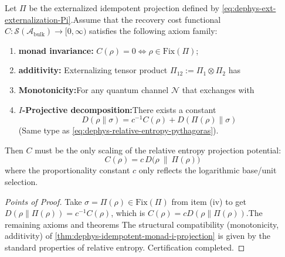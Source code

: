 \begin{proposition}\label{prop:dephys-idempotent-monad-entropy-axiomatic-uniqueness}Let \(\Pi\) be the externalized idempotent projection defined by \eqref{eq:dephys-ext-externalization-Pi}.Assume that the recovery cost functional \(C:\mathcal{S}(\mathcal{A}_{\mathrm{bulk}})\to[0,\infty)\) satisfies the following axiom family:\begin{enumerate}
\item \textbf{monad invariance:} \(C(\rho)=0\iff \rho\in\mathrm{Fix}(\Pi)\);\item \textbf{additivity:} Externalizing tensor product \(\Pi_{12}:=\Pi_1\otimes\Pi_2\) has\item \textbf{Monotonicity:}For any quantum channel \(\mathcal{N}\) that exchanges with\item \textbf{\(I\)-Projective decomposition:}There exists a constant  \[
  \boxed{\;
  D(\rho\|\sigma)=c^{-1}C(\rho)+D(\Pi(\rho)\|\sigma)\;}
  \]
(Same type as \eqref{eq:dephys-relative-entropy-pythagoras}).\end{enumerate}
Then \(C\) must be the only scaling of the relative entropy projection potential:\[
\boxed{\;
C(\rho)=c\,D\bigl(\rho\ \|\ \Pi(\rho)\bigr)\;}
\]
where the proportionality constant \(c\) only reflects the logarithmic base/unit selection.\end{proposition}
\begin{proof}[Points of Proof]Take \(\sigma=\Pi(\rho)\in\mathrm{Fix}(\Pi)\) from item (iv) to get\(
D(\rho\|\Pi(\rho))=c^{-1}C(\rho)
\), which is \(C(\rho)=cD(\rho\|\Pi(\rho))\).The remaining axioms and theorems The structural compatibility (monotonicity, additivity) of \ref{thm:dephys-idempotent-monad-i-projection} is given by the standard properties of relative entropy. Certification completed.\end{proof}

